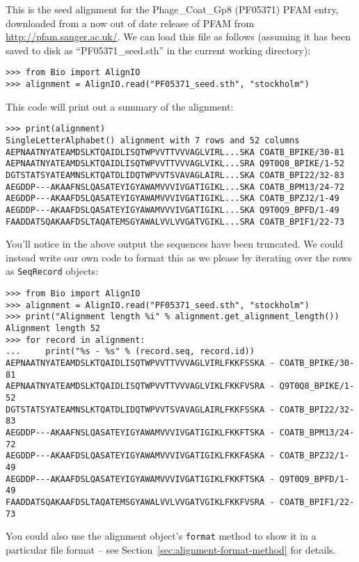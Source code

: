 \documentclass{report}
\begin{document}
This is the seed alignment for the Phage\_Coat\_Gp8 (PF05371) PFAM entry, downloaded from a now out of date release of PFAM from \url{http://pfam.sanger.ac.uk/}.  We can load this file as follows (assuming it has been saved to disk as ``PF05371\_seed.sth'' in the current working directory):

\begin{verbatim}
>>> from Bio import AlignIO
>>> alignment = AlignIO.read("PF05371_seed.sth", "stockholm")
\end{verbatim}

\noindent This code will print out a summary of the alignment:

\begin{verbatim}
>>> print(alignment)
SingleLetterAlphabet() alignment with 7 rows and 52 columns
AEPNAATNYATEAMDSLKTQAIDLISQTWPVVTTVVVAGLVIRL...SKA COATB_BPIKE/30-81
AEPNAATNYATEAMDSLKTQAIDLISQTWPVVTTVVVAGLVIKL...SRA Q9T0Q8_BPIKE/1-52
DGTSTATSYATEAMNSLKTQATDLIDQTWPVVTSVAVAGLAIRL...SKA COATB_BPI22/32-83
AEGDDP---AKAAFNSLQASATEYIGYAWAMVVVIVGATIGIKL...SKA COATB_BPM13/24-72
AEGDDP---AKAAFDSLQASATEYIGYAWAMVVVIVGATIGIKL...SKA COATB_BPZJ2/1-49
AEGDDP---AKAAFDSLQASATEYIGYAWAMVVVIVGATIGIKL...SKA Q9T0Q9_BPFD/1-49
FAADDATSQAKAAFDSLTAQATEMSGYAWALVVLVVGATVGIKL...SRA COATB_BPIF1/22-73
\end{verbatim}

You'll notice in the above output the sequences have been truncated.  We could instead write our own code to format this as we please by iterating over the rows as \verb|SeqRecord| objects:

\begin{verbatim}
>>> from Bio import AlignIO
>>> alignment = AlignIO.read("PF05371_seed.sth", "stockholm")
>>> print("Alignment length %i" % alignment.get_alignment_length())
Alignment length 52
>>> for record in alignment:
...     print("%s - %s" % (record.seq, record.id))
AEPNAATNYATEAMDSLKTQAIDLISQTWPVVTTVVVAGLVIRLFKKFSSKA - COATB_BPIKE/30-81
AEPNAATNYATEAMDSLKTQAIDLISQTWPVVTTVVVAGLVIKLFKKFVSRA - Q9T0Q8_BPIKE/1-52
DGTSTATSYATEAMNSLKTQATDLIDQTWPVVTSVAVAGLAIRLFKKFSSKA - COATB_BPI22/32-83
AEGDDP---AKAAFNSLQASATEYIGYAWAMVVVIVGATIGIKLFKKFTSKA - COATB_BPM13/24-72
AEGDDP---AKAAFDSLQASATEYIGYAWAMVVVIVGATIGIKLFKKFASKA - COATB_BPZJ2/1-49
AEGDDP---AKAAFDSLQASATEYIGYAWAMVVVIVGATIGIKLFKKFTSKA - Q9T0Q9_BPFD/1-49
FAADDATSQAKAAFDSLTAQATEMSGYAWALVVLVVGATVGIKLFKKFVSRA - COATB_BPIF1/22-73
\end{verbatim}

You could also use the alignment object's \verb|format| method to show it in a particular file format  -- see Section~\ref{sec:alignment-format-method} for details.
\end{document}
